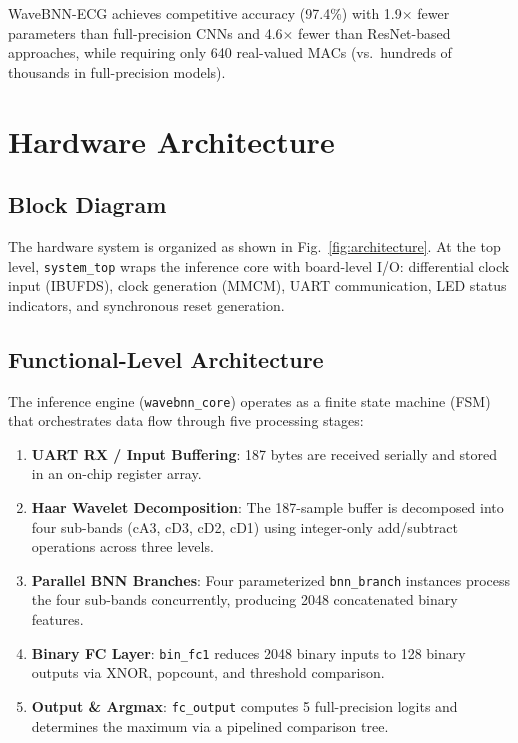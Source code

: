 \documentclass[conference]{IEEEtran}
\begin{document}
WaveBNN-ECG achieves competitive accuracy (97.4\%) with 1.9$\times$ fewer parameters than full-precision CNNs and 4.6$\times$ fewer than ResNet-based approaches, while requiring only 640 real-valued MACs (vs.\ hundreds of thousands in full-precision models).

\section{Hardware Architecture}

\subsection{Block Diagram}

The hardware system is organized as shown in Fig.~\ref{fig:architecture}. At the top level, \texttt{system\_top} wraps the inference core with board-level I/O: differential clock input (IBUFDS), clock generation (MMCM), UART communication, LED status indicators, and synchronous reset generation.

\subsection{Functional-Level Architecture}

The inference engine (\texttt{wavebnn\_core}) operates as a finite state machine (FSM) that orchestrates data flow through five processing stages:

\begin{enumerate}
    \item \textbf{UART RX / Input Buffering}: 187 bytes are received serially and stored in an on-chip register array.
    \item \textbf{Haar Wavelet Decomposition}: The 187-sample buffer is decomposed into four sub-bands (cA3, cD3, cD2, cD1) using integer-only add/subtract operations across three levels.
    \item \textbf{Parallel BNN Branches}: Four parameterized \texttt{bnn\_branch} instances process the four sub-bands concurrently, producing 2048 concatenated binary features.
    \item \textbf{Binary FC Layer}: \texttt{bin\_fc1} reduces 2048 binary inputs to 128 binary outputs via XNOR, popcount, and threshold comparison.
    \item \textbf{Output \& Argmax}: \texttt{fc\_output} computes 5 full-precision logits and determines the maximum via a pipelined comparison tree.
\end{enumerate}
\end{document}
